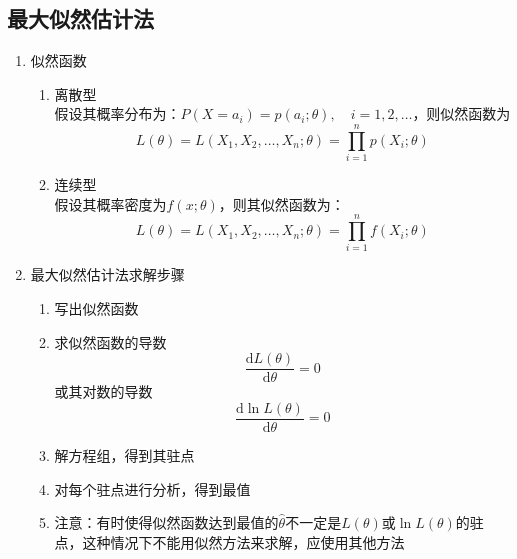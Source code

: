 \subsection{最大似然估计法}
\begin{enumerate}
	\item 似然函数
	\begin{enumerate}
		\item 离散型 \\
		假设其概率分布为：$P(X=a_i) = p(a_i;\theta), \quad i=1,2, \dots$，则似然函数为
		\begin{equation}
			L(\theta) = L(X_1, X_2, \dots, X_n; \theta) = \prod_{i=1}^{n}p(X_i;\theta)
		\end{equation}
		\item 连续型 \\
		假设其概率密度为$f(x;\theta)$，则其似然函数为：
		\begin{equation}
			L(\theta) = L(X_1, X_2, \dots, X_n; \theta) = \prod_{i=1}^{n}f(X_i;\theta)
		\end{equation}
	\end{enumerate}
	\item 最大似然估计法求解步骤
	\begin{enumerate}
		\item 写出似然函数
		\item 求似然函数的导数
		\begin{equation}
			\frac{\mathrm{d}L(\theta)}{\mathrm{d}\theta} = 0
		\end{equation}
		或其对数的导数
		\begin{equation}
			\frac{\mathrm{d}\ln L(\theta)}{\mathrm{d}\theta} = 0
		\end{equation}
		\item 解方程组，得到其驻点
		\item 对每个驻点进行分析，得到最值
		\item 注意：有时使得似然函数达到最值的$\hat{\theta}$不一定是$L(\theta)$或$\ln L(\theta)$的驻点，这种情况下不能用似然方法来求解，应使用其他方法
	\end{enumerate}
\end{enumerate}

